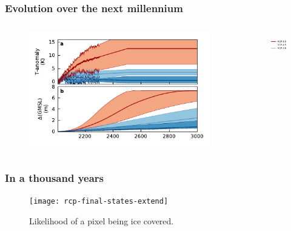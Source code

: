 \documentclass[hide notes,intlimits]{beamer}
\begin{document}
\begin{frame}
  \frametitle{Evolution over the next millennium}
  \begin{columns}[c]
    \begin{column}{.85\linewidth}
    \begin{figure}
    \includegraphics[width=\textwidth]{les18_les}
    \end{figure}
    \end{column}
    \begin{column}{.15\linewidth}
      \begin{figure}
        \includegraphics[height=1cm]{legend-rcp}
      \end{figure}
    \end{column}
  \end{columns}
\end{frame}

\begin{frame}
  \frametitle{In a thousand years}
  \begin{figure}
    \texttt{[image: rcp-final-states-extend]}
  \caption{Likelihood of a pixel being ice covered.}
  \end{figure}

\end{frame}
\end{document}
